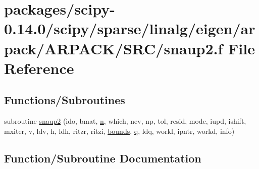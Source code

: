 \hypertarget{snaup2_8f}{}\section{packages/scipy-\/0.14.0/scipy/sparse/linalg/eigen/arpack/\+A\+R\+P\+A\+C\+K/\+S\+R\+C/snaup2.f File Reference}
\label{snaup2_8f}
\subsection*{Functions/\+Subroutines}
\begin{DoxyCompactItemize}
\item 
subroutine \hyperlink{snaup2_8f_a6c0f93decd87948c8183fd9929198793}{snaup2} (ido, bmat, \hyperlink{indexexpr_8h_ab427e2e2b4d6cec55fa088ea2a692ace}{n}, which, nev, np, tol, resid, mode, iupd, ishift, mxiter, v, ldv, h, ldh, ritzr, ritzi, \hyperlink{structbounds}{bounds}, \hyperlink{indexexpr_8h_ac886c3584e464b5533390d7440c9dd98}{q}, ldq, workl, ipntr, workd, info)
\end{DoxyCompactItemize}


\subsection{Function/\+Subroutine Documentation}
\hypertarget{snaup2_8f_a6c0f93decd87948c8183fd9929198793}{}
